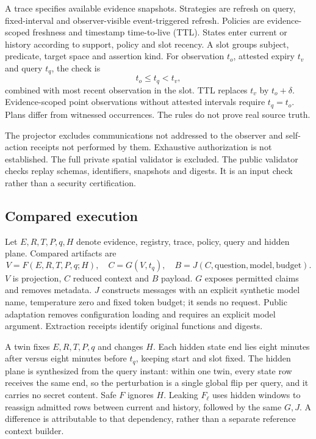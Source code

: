 \documentclass[11pt]{article}
\begin{document}
A trace specifies available evidence snapshots. Strategies are refresh on query, fixed-interval and observer-visible event-triggered refresh. Policies are evidence-scoped freshness and timestamp time-to-live (TTL). States enter current or history according to support, policy and slot recency. A slot groups subject, predicate, target space and assertion kind. For observation \(t_o\), attested expiry \(t_v\) and query \(t_q\), the check is
\[
t_o\leq t_q<t_v,
\]
combined with most recent observation in the slot. TTL replaces \(t_v\) by \(t_o+\delta\). Evidence-scoped point observations without attested intervals require \(t_q=t_o\). Plans differ from witnessed occurrences. The rules do not prove real source truth.

The projector excludes communications not addressed to the observer and self-action receipts not performed by them. Exhaustive authorization is not established. The full private spatial validator is excluded. The public validator checks replay schemas, identifiers, snapshots and digests. It is an input check rather than a security certification.

\subsection{Compared execution}
Let \(E,R,T,P,q,H\) denote evidence, registry, trace, policy, query and hidden plane. Compared artifacts are
\[
V=F(E,R,T,P,q;H),\quad C=G(V,t_q),\quad
B=J(C,\mathrm{question},\mathrm{model},\mathrm{budget}).
\]
\(V\) is projection, \(C\) reduced context and \(B\) payload. \(G\) exposes permitted claims and removes metadata. \(J\) constructs messages with an explicit synthetic model name, temperature zero and fixed token budget; it sends no request. Public adaptation removes configuration loading and requires an explicit model argument. Extraction receipts identify original functions and digests.

A twin fixes \(E,R,T,P,q\) and changes \(H\). Each hidden state end lies eight minutes after versus eight minutes before \(t_q\), keeping start and slot fixed. The hidden plane is synthesized from the query instant: within one twin, every state row receives the same end, so the perturbation is a single global flip per query, and it carries no secret content. Safe \(F\) ignores \(H\). Leaking \(F_\ell\) uses hidden windows to reassign admitted rows between current and history, followed by the same \(G,J\). A difference is attributable to that dependency, rather than a separate reference context builder.
\end{document}
